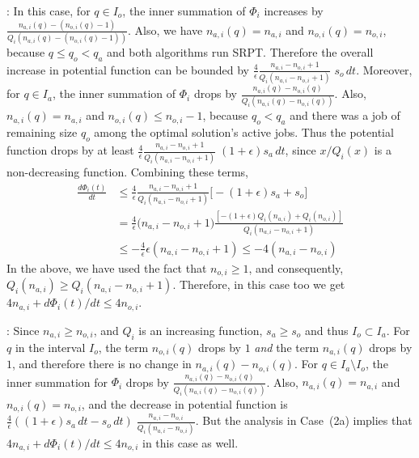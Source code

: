\documentclass[11pt]{article}
\newcommand{\tsty}{}
\newcommand{\constun}{\frac{4}{\epsilon}}
\newcommand{\dphidt}{{\frac{d \Phi_i(t)}{dt}}}
\newcommand{\dphidtside}{d \Phi_i(t)/dt}
\begin{document}
\medskip {}: In this case, for $q \in I_o$, the inner summation of $\Phi_i$
increases by $ \frac{n_{a,i}(q) - (n_{o,i}(q) - 1)}{Q_i( n_{a,i}(q) -
  (n_{o,i}(q) - 1))}$. Also, we have $n_{a,i}(q) = n_{a,i}$ and
$n_{o,i}(q) = n_{o,i}$, because $q \leq q_o < q_a$ and both algorithms
run SRPT. Therefore the overall increase in potential function can be
bounded by $\constun \frac{n_{a,i} - n_{o,i} + 1}{Q_i(n_{a,i} - n_{o,i} + 1)} \;
s_o \,dt $. Moreover, for $q \in I_a$, the inner summation of $\Phi_i$
drops by $ \frac{n_{a,i}(q) - n_{o,i}(q)}{Q_i(n_{a,i}(q) - n_{o,i}(q))}$. Also, $n_{a,i}(q) = n_{a,i}$ and $n_{o,i}(q) \leq n_{o,i} - 1$,
because $q_o < q_a$ and there was a job of remaining size $q_o$ among
the optimal solution's active jobs. Thus the potential function drops by
at least $ \constun \frac{n_{a,i} - n_{o,i} + 1}{Q_i(n_{a,i} - n_{o,i} + 1)}\; (1
+\epsilon) s_a \,dt $, since $x/Q_i(x)$ is a non-decreasing function.
Combining these terms,
\begin{align*}
  \tsty \dphidt &\leq \tsty \constun \frac{n_{a,i} - n_{o,i} +
    1}{Q_i(n_{a,i} - n_{o,i} + 1)} \big[ -(1+\epsilon) s_a + s_o \big]
  \\
  & = \constun \big( n_{a,i} - n_{o,i} + 1 \big) \frac {[ -(1+\epsilon)
    Q_i(n_{a,i}) + Q_i(n_{o,i}) ]} {Q_i(n_{a,i} - n_{o,i} + 1)}  \\
  &\tsty \leq - \constun \epsilon (n_{a,i} - n_{o,i} + 1) \leq - 4
  (n_{a,i} - n_{o,i})
\end{align*}
In the above, we have used the fact that $n_{o,i} \geq 1$, and consequently, $Q_i(n_{a,i}) \geq Q_i(n_{a,i}- n_{o,i} + 1)$. Therefore, in this case too we get $4 n_{a,i} + \dphidtside \leq 4 n_{o,i}$.

\medskip {}: Since $n_{a,i} \geq n_{o,i}$, and $Q_i$ is an increasing
function, $s_a \geq s_o$ and thus $I_o \subset I_a$. For $q$ in the
interval $I_o$, the term $n_{o,i}(q)$ drops by $1$ \emph{and} the term
$n_{a,i}(q)$ drops by $1$, and therefore there is no change in
$n_{a,i}(q) - n_{o,i}(q)$. For $q \in I_a \setminus I_o$, the inner
summation for $\Phi_i$ drops by $\frac{n_{a,i}(q) - n_{o,i}(q) }{Q_i(
  n_{a,i}(q) - n_{o,i}(q))}$. Also, $n_{a,i}(q) = n_{a,i}$ and
$n_{o,i}(q) = n_{o,i}$, and the decrease in potential function is $\constun (
(1+\epsilon) s_a \,dt - s_o \,dt) \; \frac{n_{a,i} - n_{o,i} }{Q_i(n_{a,i} -
  n_{o,i})}$. But the analysis in Case~(2a) implies that $4n_{a,i}
+ \dphidtside \leq 4 n_{o,i}$ in this case as well.
\end{document}
